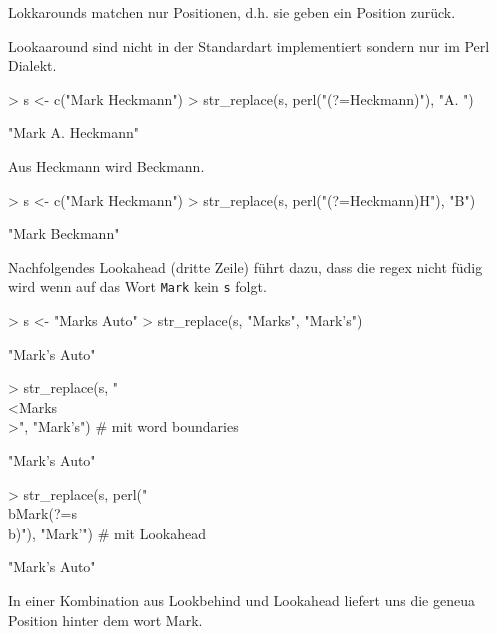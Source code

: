 \documentclass[a4paper]{report}
\begin{document}
Lokkarounds matchen nur Positionen, d.h. sie geben ein Position zurück.

Lookaaround sind nicht in der Standardart implementiert sondern nur im Perl Dialekt.
\begin{Schunk}
\begin{Sinput}
> s <- c("Mark Heckmann")
> str_replace(s, perl("(?=Heckmann)"), "A. ")
\end{Sinput}
\begin{Soutput}
[1] "Mark A. Heckmann"
\end{Soutput}
\end{Schunk}

Aus Heckmann wird Beckmann.
\begin{Schunk}
\begin{Sinput}
> s <- c("Mark Heckmann")
> str_replace(s, perl("(?=Heckmann)H"), "B")
\end{Sinput}
\begin{Soutput}
[1] "Mark Beckmann"
\end{Soutput}
\end{Schunk}

Nachfolgendes Lookahead (dritte Zeile) führt dazu, dass die regex nicht füdig wird wenn auf das Wort \texttt{Mark} kein \texttt{s} folgt. 
\begin{Schunk}
\begin{Sinput}
> s <- "Marks Auto"
> str_replace(s, "Marks", "Mark's")
\end{Sinput}
\begin{Soutput}
[1] "Mark's Auto"
\end{Soutput}
\begin{Sinput}
> str_replace(s, "\\<Marks\\>", "Mark's")       # mit word boundaries
\end{Sinput}
\begin{Soutput}
[1] "Mark's Auto"
\end{Soutput}
\begin{Sinput}
> str_replace(s, perl("\\bMark(?=s\\b)"), "Mark'")    # mit Lookahead
\end{Sinput}
\begin{Soutput}
[1] "Mark's Auto"
\end{Soutput}
\end{Schunk}
 
In einer Kombination aus Lookbehind und Lookahead liefert uns die geneua Position hinter dem wort Mark.
\end{document}
